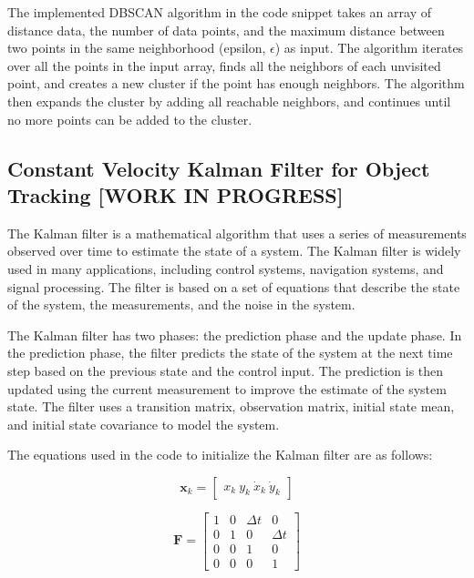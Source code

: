 \documentclass[journal]{IEEEtran} %
\begin{document}
The implemented DBSCAN algorithm in the code snippet takes an array of distance data, the number of data points, and the maximum distance between two points in the same neighborhood (epsilon, $\epsilon$) as input. The algorithm iterates over all the points in the input array, finds all the neighbors of each unvisited point, and creates a new cluster if the point has enough neighbors. The algorithm then expands the cluster by adding all reachable neighbors, and continues until no more points can be added to the cluster.


\subsection{Constant Velocity Kalman Filter for Object Tracking [WORK IN PROGRESS]}

The Kalman filter is a mathematical algorithm that uses a series of measurements observed over time to estimate the state of a system. The Kalman filter is widely used in many applications, including control systems, navigation systems, and signal processing. The filter is based on a set of equations that describe the state of the system, the measurements, and the noise in the system.

The Kalman filter has two phases: the prediction phase and the update phase. In the prediction phase, the filter predicts the state of the system at the next time step based on the previous state and the control input. The prediction is then updated using the current measurement to improve the estimate of the system state. The filter uses a transition matrix, observation matrix, initial state mean, and initial state covariance to model the system.

The equations used in the code to initialize the Kalman filter are as follows:

\begin{equation}
\mathbf{x}_k = \begin{bmatrix} x_k \ y_k \ \dot{x}_k \ \dot{y}_k \end{bmatrix}
\end{equation}

\begin{equation}
\mathbf{F} = \begin{bmatrix} 1 & 0 & \Delta t & 0 \\ 0 & 1 & 0 & \Delta t \\ 0 & 0 & 1 & 0 \\ 0 & 0 & 0 & 1 \end{bmatrix}
\end{equation}
\end{document}
